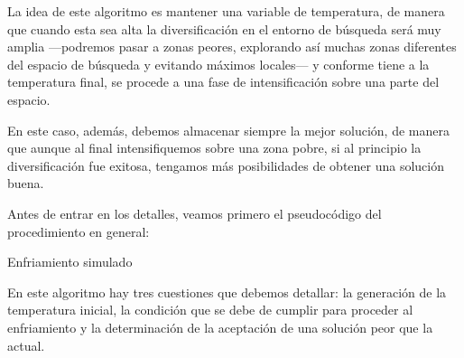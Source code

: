 \documentclass[a4paper, 11pt, titlepage]{article}
\begin{document}
    La idea de este algoritmo es mantener una variable de temperatura, de manera que cuando esta sea alta la diversificación en el entorno de búsqueda será muy amplia ---podremos pasar a zonas peores, explorando así muchas zonas diferentes del espacio de búsqueda y evitando máximos locales--- y conforme tiene a la temperatura final, se procede a una fase de intensificación sobre una parte del espacio.

    En este caso, además, debemos almacenar siempre la mejor solución, de manera que aunque al final intensifiquemos sobre una zona pobre, si al principio la diversificación fue exitosa, tengamos más posibilidades de obtener una solución buena.

    Antes de entrar en los detalles, veamos primero el pseudocódigo del procedimiento en general:

    \begin{algorithm}
        \caption{Enfriamiento simulado}\label{enfSimul}
        \begin{algorithmic}[1]
            \State s $\gets$ genInitSolution()
            \State bestSolution $\gets$ s
            \State bestScore $\gets$ score(s, train, target)
            \State currentScore $\gets$ bestScore
            \State $t \gets t_0$
            \State neighboursAccepted $\gets$ 0
            \State f $\gets$ genRandomFeature(s)} \Comment{With replacement}
            \State s' $\gets$ genNeighbour(s,f)
            \State newScore $\gets$ score(s', train, target)
            \State $\Delta = currentScore - newScore$
            \If{$\Delta < 0$ \textbf{or} acceptWorseSolution = True}
            \State currentScore $\gets$ newScore
            \State acceptedNeighbourgs++
            \If{currentScore $>$ bestScore}
            \State bestScore $\gets$ currentScore
            \State bestSolution $\gets$ s
            \EndIf
            \EndIf
            \EndWhile
            \State $t \gets$ coolingScheme(t)
            \EndWhile
            \State \Return s, bestScore
            \EndFunction
        \end{algorithmic}
    \end{algorithm}

    En este algoritmo hay tres cuestiones que debemos detallar: la generación de la temperatura inicial, la condición que se debe de cumplir para proceder al enfriamiento y la determinación de la aceptación de una solución peor que la actual.

\end{document}
